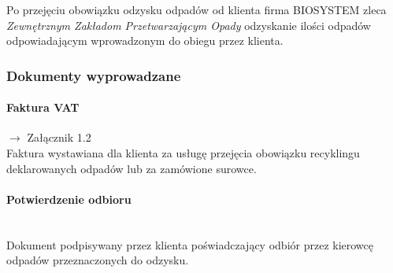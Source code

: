 	Po przejęciu obowiązku odzysku odpadów od klienta firma BIOSYSTEM zleca \emph{Zewnętrznym Zakładom Przetwarzającym Opady} odzyskanie ilości odpadów odpowiadającym wprowadzonym do obiegu przez klienta.

\subsubsection{Dokumenty wyprowadzane}
	\paragraph{Faktura VAT} $\rightarrow$ Załącznik 1.2 \\
	Faktura wystawiana dla klienta za usługę przejęcia obowiązku recyklingu deklarowanych odpadów lub za zamówione surowce.

	\paragraph{Potwierdzenie odbioru} \ \\
	Dokument podpisywany przez klienta poświadczający odbiór przez kierowcę odpadów przeznaczonych do odzysku.
